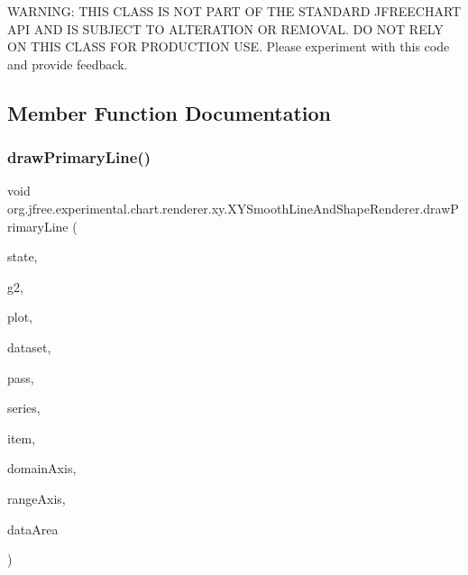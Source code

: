 W\+A\+R\+N\+I\+NG\+: T\+H\+IS C\+L\+A\+SS IS N\+OT P\+A\+RT OF T\+HE S\+T\+A\+N\+D\+A\+RD J\+F\+R\+E\+E\+C\+H\+A\+RT A\+PI A\+ND IS S\+U\+B\+J\+E\+CT TO A\+L\+T\+E\+R\+A\+T\+I\+ON OR R\+E\+M\+O\+V\+AL. DO N\+OT R\+E\+LY ON T\+H\+IS C\+L\+A\+SS F\+OR P\+R\+O\+D\+U\+C\+T\+I\+ON U\+SE. Please experiment with this code and provide feedback. 

\subsection{Member Function Documentation}
\mbox{\label{classorg_1_1jfree_1_1experimental_1_1chart_1_1renderer_1_1xy_1_1_x_y_smooth_line_and_shape_renderer_af87cbfac275f93906617bcb4e56adad6}} 
\subsubsection{\texorpdfstring{draw\+Primary\+Line()}{drawPrimaryLine()}}
{\footnotesize\ttfamily void org.\+jfree.\+experimental.\+chart.\+renderer.\+xy.\+X\+Y\+Smooth\+Line\+And\+Shape\+Renderer.\+draw\+Primary\+Line (\begin{DoxyParamCaption}\item[{\mbox{\hyperlink{classorg_1_1jfree_1_1chart_1_1renderer_1_1xy_1_1_x_y_item_renderer_state}{X\+Y\+Item\+Renderer\+State}}}]{state,  }\item[{Graphics2D}]{g2,  }\item[{\mbox{\hyperlink{classorg_1_1jfree_1_1chart_1_1plot_1_1_x_y_plot}{X\+Y\+Plot}}}]{plot,  }\item[{\mbox{\hyperlink{interfaceorg_1_1jfree_1_1data_1_1xy_1_1_x_y_dataset}{X\+Y\+Dataset}}}]{dataset,  }\item[{int}]{pass,  }\item[{int}]{series,  }\item[{int}]{item,  }\item[{\mbox{\hyperlink{classorg_1_1jfree_1_1chart_1_1axis_1_1_value_axis}{Value\+Axis}}}]{domain\+Axis,  }\item[{\mbox{\hyperlink{classorg_1_1jfree_1_1chart_1_1axis_1_1_value_axis}{Value\+Axis}}}]{range\+Axis,  }\item[{Rectangle2D}]{data\+Area }\end{DoxyParamCaption})\hspace{0.3cm}{\ttfamily [protected]}}

